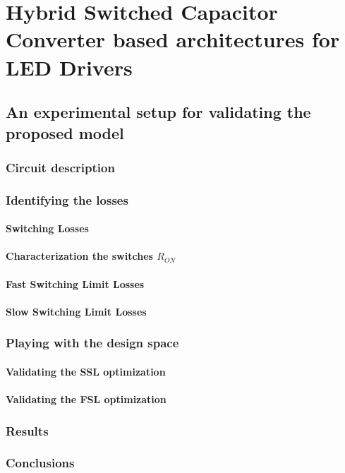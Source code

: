 \part{Hybrid Switched Capacitor Converter based architectures for LED Drivers }

\chapter{An experimental setup for validating the proposed model}
\section{Circuit description}
\section{Identifying the losses}
\subsection{Switching Losses}
\subsection{Characterization the switches $R_{ON}$ }
\subsection{Fast Switching Limit Losses}
\subsection{Slow Switching Limit Losses}
\section{Playing with the design space}
\subsection{Validating the SSL optimization}
\subsection{Validating the FSL optimization}

\section{Results}
\section{Conclusions}